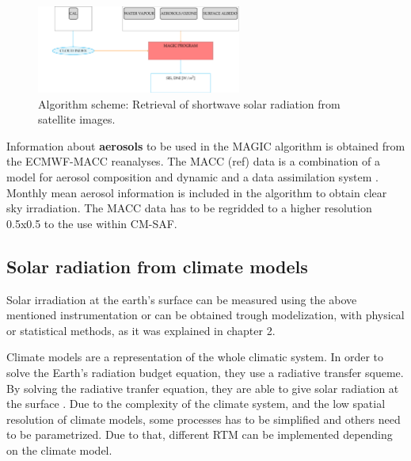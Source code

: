 \begin{figure}
  \centering
  \includegraphics[width=0.6\textwidth]{figs/esquemasat.pdf}
  \caption{Algorithm scheme: Retrieval of shortwave solar radiation from satellite images.}
 \label{fig:algorithm}
\end{figure}

Information about \textbf{aerosols} to be used in the MAGIC algorithm is obtained from the ECMWF-MACC reanalyses. The MACC (ref) data is a combination of a model for aerosol composition and dynamic \cite*{Morcrette2009} and a data assimilation system \cite*{Benedetti2009}. Monthly mean aerosol information is included in the algorithm to obtain clear sky irradiation. The MACC data has to be regridded to a higher resolution 0.5x0.5 to the use within CM-SAF.


\subsection{Solar radiation from climate models}%


Solar irradiation at the earth's surface can be measured using the above mentioned instrumentation or can be obtained trough modelization, with physical or statistical methods, as it was explained in chapter 2.

Climate models are a representation of the whole climatic system. In order to solve the Earth's radiation budget equation, they use a radiative transfer squeme. By solving the radiative tranfer equation, they are able to give solar radiation at the surface . Due to the complexity of the climate system, and the low spatial resolution of climate models, some processes has to be simplified and others need to be parametrized. Due to that, different RTM can be implemented depending on the climate model.

